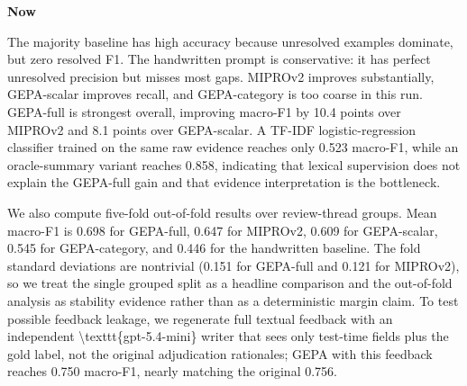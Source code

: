 \documentclass[11pt]{article}
\newenvironment{nowbox}{\def\FrameCommand{\fboxsep=7pt\colorbox{nowblue}}\MakeFramed{\advance\hsize-2\width\FrameRestore}\small}{\endMakeFramed}
\begin{document}
\noindent\textbf{Now}

\begin{nowbox}
The majority baseline has high accuracy because unresolved examples dominate, but zero resolved F1. The handwritten prompt is conservative: it has perfect unresolved precision but misses most gaps. MIPROv2 improves substantially, GEPA-scalar improves recall, and GEPA-category is too coarse in this run. GEPA-full is strongest overall, improving macro-F1 by 10.4 points over MIPROv2 and 8.1 points over GEPA-scalar. A TF-IDF logistic-regression classifier trained on the same raw evidence reaches only 0.523 macro-F1, while an oracle-summary variant reaches 0.858, indicating that lexical supervision does not explain the GEPA-full gain and that evidence interpretation is the bottleneck.\par
\par
We also compute five-fold out-of-fold results over review-thread groups. Mean macro-F1 is 0.698 for GEPA-full, 0.647 for MIPROv2, 0.609 for GEPA-scalar, 0.545 for GEPA-category, and 0.446 for the handwritten baseline. The fold standard deviations are nontrivial (0.151 for GEPA-full and 0.121 for MIPROv2), so we treat the single grouped split as a headline comparison and the out-of-fold analysis as stability evidence rather than as a deterministic margin claim. To test possible feedback leakage, we regenerate full textual feedback with an independent \textbackslash{}texttt\{gpt-5.4-mini\} writer that sees only test-time fields plus the gold label, not the original adjudication rationales; GEPA with this feedback reaches 0.750 macro-F1, nearly matching the original 0.756.
\end{nowbox}
\end{document}
